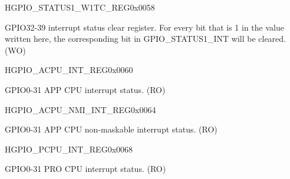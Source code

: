 \begin{register}{H}{GPIO\_STATUS1\_W1TC\_REG}{0x0058}\label{regdesc:GPIOSTATUS1W1TCREG}
%
%
\regnewline%
\begin{regdesc}\begin{reglist}
\item [GPIO\_STATUS1\_INT\_W1TC]GPIO32-39 interrupt status clear register. For every bit that is 1 in the value written here, the corresponding bit in GPIO\_STATUS1\_INT will be cleared. (WO)
\end{reglist}\end{regdesc}
\end{register}


\begin{register}{H}{GPIO\_ACPU\_INT\_REG}{0x0060}\label{regdesc:GPIOACPUINTREG}
%
\regnewline%
\begin{regdesc}\begin{reglist}
\item [GPIO\_ACPU\_INT\_REG]GPIO0-31 APP CPU interrupt status. (RO)
\end{reglist}\end{regdesc}
\end{register}


\begin{register}{H}{GPIO\_ACPU\_NMI\_INT\_REG}{0x0064}\label{regdesc:GPIOACPUNMIINTREG}
%
\regnewline%
\begin{regdesc}\begin{reglist}
\item [GPIO\_ACPU\_NMI\_INT\_REG]GPIO0-31 APP CPU non-maskable interrupt status. (RO)
\end{reglist}\end{regdesc}
\end{register}


\begin{register}{H}{GPIO\_PCPU\_INT\_REG}{0x0068}\label{regdesc:GPIOPCPUINTREG}
%
\regnewline%
\begin{regdesc}\begin{reglist}
\item [GPIO\_PCPU\_INT\_REG]GPIO0-31 PRO CPU interrupt status. (RO)
\end{reglist}\end{regdesc}
\end{register}


